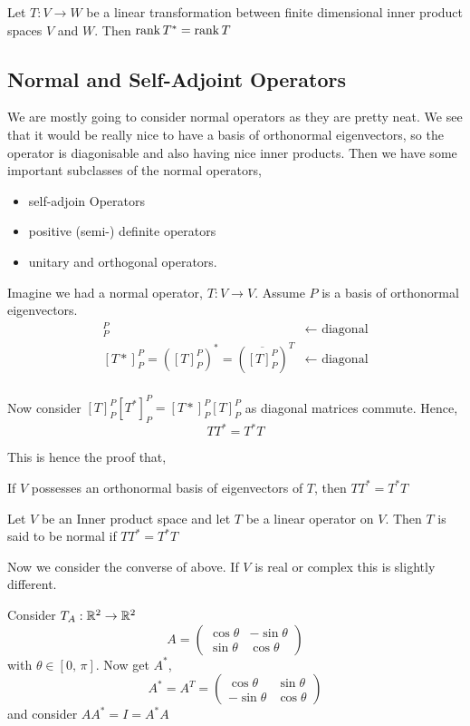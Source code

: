 \documentclass{article}
\begin{document}
\begin{ncor}
  Let $T : V \to W$ be a linear transformation between finite dimensional inner product spaces $V$ and $W$. Then $\operatorname{rank} T^* = \operatorname{rank} T$
\end{ncor}

\subsection{Normal and Self-Adjoint Operators}

We are mostly going to consider normal operators as they are pretty neat. We see that it would be really nice to have a basis of orthonormal eigenvectors, so the operator is diagonisable and also having nice inner products. Then we have some important subclasses of the normal operators,
\begin{itemize}
  \item self-adjoin Operators
  \item positive (semi-) definite operators
  \item unitary and orthogonal operators.
\end{itemize}

Imagine we had a normal operator, $T : V \to V$. Assume $P$ is a basis of orthonormal eigenvectors.
\begin{align*}
  [T]_P^P &\leftarrow \text{ diagonal}\\
  [T*]_P^P = ([T]_P^P)^* = (\overline{[T]_P^P})^T &\leftarrow \text{ diagonal}\\
\end{align*}

Now consider $\displaystyle{[T]_P^P[T^*]_P^P = [T*]_P^P[T]_P^P}$ as diagonal matrices commute. Hence,
$$ TT^* = T^*T $$

This is hence the proof that,
\begin{nlemma}
  If $V$ possesses an orthonormal basis of eigenvectors of $T$, then $TT^* = T^*T$
\end{nlemma}

\begin{ndefi}
  Let $V$ be an Inner product space and let $T$ be a linear operator on $V$. Then $T$ is said to be normal if $TT^* = T^*T$
\end{ndefi}

Now we consider the converse of above. If $V$ is real or complex this is slightly different.

\begin{eg}
  Consider $T_A : \mathbb{R}^2 \to \mathbb{R}^2$
  $$A = \begin{pmatrix}
    \cos\theta & -\sin\theta\\
    \sin\theta & \cos\theta
  \end{pmatrix}$$
  with $\theta\in [0,\,\pi]$. Now get $A^*$,
  $$ A^* = A^T = \begin{pmatrix}
    \cos\theta & \sin\theta\\
    -\sin\theta & \cos\theta
  \end{pmatrix} $$
  and consider $AA^* = I = A^*A$
\end{eg}
\end{document}
